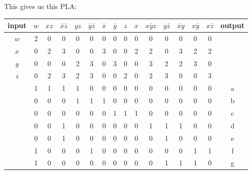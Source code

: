 \documentclass[10pt,a4paper]{scrartcl}
\begin{document}
This gives us this PLA:\\
\begin{tabular}{|c||c|c|c|c|c|c|c|c|c|c|c|c|c|c||c|}
  \hline
 input  & $w$ & $xz$ & $\bar x\bar z$ & $yz$ & $\bar y\bar z$ & $\bar x$ & $\bar y$ & $z$ & $x$ & $x\bar yz$ & $y\bar z$ & $\bar xy$ & $x\bar y$ & $x\bar z$ & output \\ \hline\hline
  $w$   & 2   & 0    &      0         &  0   &      0         &    0     &   0      &  0  &  0  &     0      &     0     &    0      &   0       &    0      &        \\ \hline
  $x$   & 0   & 2    &      3         &  0   &      0         &    3     &   0      &  0  &  2  &     2      &     0     &    3      &   2       &    2      &        \\ \hline
  $y$   & 0   & 0    &      0         &  2   &      3         &    0     &   3      &  0  &  0  &     3      &     2     &    2      &   3       &    0      &        \\ \hline
  $z$   & 0   & 2    &      3         &  2   &      3         &    0     &   0      &  2  &  0  &     2      &     3     &    0      &   0       &    3      &        \\ \hline\hline
        & 1   & 1    &      1         &  1   &      0         &    0     &   0      &  0  &  0  &     0      &     0     &    0      &   0       &    0      &   a    \\ \hline
        & 0   & 0    &      0         &  1   &      1         &    1     &   0      &  0  &  0  &     0      &     0     &    0      &   0       &    0      &   b    \\ \hline
        & 0   & 0    &      0         &  0   &      0         &    0     &   1      &  1  &  1  &     0      &     0     &    0      &   0       &    0      &   c    \\ \hline
        & 0   & 0    &      1         &  0   &      0         &    0     &   0      &  0  &  0  &     1      &     1     &    1      &   0       &    0      &   d    \\ \hline
        & 0   & 0    &      1         &  0   &      0         &    0     &   0      &  0  &  0  &     0      &     1     &    0      &   0       &    0      &   e    \\ \hline
        & 1   & 0    &      0         &  0   &      1         &    0     &   0      &  0  &  0  &     0      &     0     &    0      &   1       &    1      &   f    \\ \hline
        & 1   & 0    &      0         &  0   &      0         &    0     &   0      &  0  &  0  &     0      &     1     &    1      &   1       &    0      &   g    \\ \hline
\end{tabular}
\end{document}
